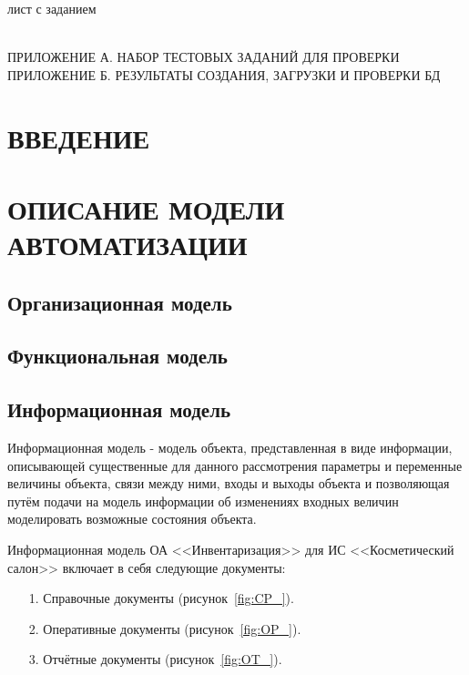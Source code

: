 \documentclass[12pt, a4paper, simple]{eskdtext}
\begin{document}
    

    лист с заданием
    \newpage

    \tableofcontents
    \thispagestyle{toc}
    \pagestyle{toc}
    \hspace{0pt}\\
    ПРИЛОЖЕНИЕ А. НАБОР ТЕСТОВЫХ ЗАДАНИЙ ДЛЯ ПРОВЕРКИ\\
    ПРИЛОЖЕНИЕ Б. РЕЗУЛЬТАТЫ СОЗДАНИЯ, ЗАГРУЗКИ И ПРОВЕРКИ БД\\
    \newpage

    \newpage
    \section*{ВВЕДЕНИЕ}
    \newpage

    \section{ОПИСАНИЕ МОДЕЛИ АВТОМАТИЗАЦИИ}
    \subsection{Организационная модель}
    \subsection{Функциональная модель}

    \newpage
    \subsection{Информационная модель}
    Информационная модель - модель объекта, представленная в виде информации,
    описывающей существенные для данного рассмотрения параметры и переменные величины объекта,
    связи между ними, входы и выходы объекта и позволяющая путём подачи на модель информации об изменениях
    входных величин моделировать возможные состояния объекта.

    Информационная модель ОА <<Инвентаризация>> для ИС <<Косметический салон>> включает в себя следующие документы:

    \begin{enumerate}
        \item[1.] Справочные документы (рисунок~\ref{fig:CP_}).
        \item[2.] Оперативные документы (рисунок~\ref{fig:OP_}).
        \item[3.] Отчётные документы (рисунок~\ref{fig:OT_}).
    \end{enumerate}
\end{document}
